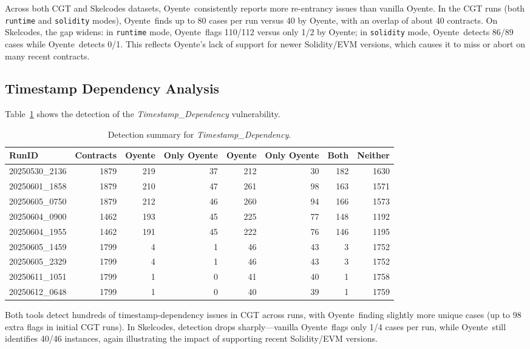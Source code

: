 \documentclass{article}
\newcommand\OY{Oyente}
\newcommand\OYp{\OY\raisebox{0.3ex}{\smaller +}}
\newcommand\CGTrbcA{20250530\_2136}%
\newcommand\CGTrbcB{20250601\_1858}%
\newcommand\CGTrbcC{20250605\_0750}%
\newcommand\CGTsscA{20250604\_0900}%
\newcommand\CGTsscB{20250604\_1955}%
\newcommand\SKCrbcA{20250605\_1459}%
\newcommand\SKCrbcB{20250605\_2329}%
\newcommand\SKCsscA{20250611\_1051}%
\newcommand\SKCsscB{20250612\_0648}%
\begin{document}
	Across both CGT and Skelcodes datasets, \OYp\ consistently reports more re-entrancy issues than vanilla \OY. In the CGT runs (both \texttt{runtime} and \texttt{solidity} modes), \OYp\ finds up to 80 cases per run versus 40 by \OY, with an overlap of about 40 contracts. On Skelcodes, the gap widens: in \texttt{runtime} mode, \OYp\ flags 110/112 versus only 1/2 by \OY; in \texttt{solidity} mode, \OYp\ detects 86/89 cases while \OY\ detects 0/1. This reflects \OY’s lack of support for newer Solidity/EVM versions, which causes it to miss or abort on many recent contracts.

	\subsection{Timestamp Dependency Analysis}
	Table~\ref{tab:timestamp-results} shows the detection of the \emph{Timestamp\_Dependency} vulnerability.

	\begin{table}[ht]
		\centering
		\begin{tabular}{lrrrrrrr}
			\toprule
			\textbf{RunID} & \textbf{Contracts} & \textbf{\OY} & \textbf{Only \OY} & \textbf{\OYp} & \textbf{Only \OYp} & \textbf{Both} & \textbf{Neither} \\
			\midrule
			\CGTrbcA & 1879 & 219 & 37 & 212 & 30 & 182 & 1630 \\
			\CGTrbcB & 1879 & 210 & 47 & 261 & 98 & 163 & 1571 \\
			\CGTrbcC & 1879 & 212 & 46 & 260 & 94 & 166 & 1573 \\
			\CGTsscA & 1462 & 193 & 45 & 225 & 77 & 148 & 1192 \\
			\CGTsscB & 1462 & 191 & 45 & 222 & 76 & 146 & 1195 \\
			\SKCrbcA & 1799 & 4 & 1 & 46 & 43 & 3 & 1752 \\
			\SKCrbcB & 1799 & 4 & 1 & 46 & 43 & 3 & 1752 \\
			\SKCsscA & 1799 & 1 & 0 & 41 & 40 & 1 & 1758 \\
			\SKCsscB & 1799 & 1 & 0 & 40 & 39 & 1 & 1759 \\
			\bottomrule
		\end{tabular}
		\caption{Detection summary for \emph{Timestamp\_Dependency}.}
		\label{tab:timestamp-results}
	\end{table}

	Both tools detect hundreds of timestamp-dependency issues in CGT across runs, with \OYp\ finding slightly more unique cases (up to 98 extra flags in initial CGT runs). In Skelcodes, detection drops sharply—vanilla \OY\ flags only 1/4 cases per run, while \OYp\ still identifies 40/46 instances, again illustrating the impact of supporting recent Solidity/EVM versions.
\end{document}
